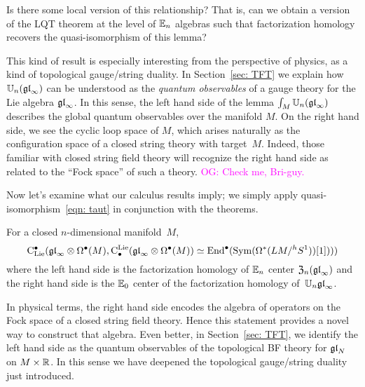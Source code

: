 \documentclass[11pt]{amsart}
\numberwithin{equation}{section}
\def\owen{\textcolor{magenta}{OG: }\textcolor{magenta}}
\begin{document}
\begin{qtn}
Is there some local version of this relationship? That is, can we obtain a version of the LQT theorem at the level of $\mathbb E_n$ algebras such that factorization homology recovers the quasi-isomorphism of this lemma?
\end{qtn}

This kind of result is especially interesting from the perspective of physics, 
as a kind of topological gauge/string duality.
In Section~\ref{sec: TFT} we explain how $\mathbb U_n({\mathfrak{gl}}_\infty)$ can be understood as the {\em quantum observables} of a gauge theory for the Lie algebra ${\mathfrak{gl}}_\infty$.
In this sense, the left hand side of the lemma $\int_M \mathbb U_n(\frak{gl}_\infty)$ describes the global quantum observables over the manifold $M$.
On the right hand side, we see the cyclic loop space of $M$,
which arises naturally as the configuration space of a closed string theory with target~$M$.
Indeed, those familiar with closed string field theory will recognize the right hand side as related to the ``Fock space'' of such a theory.
\owen{Check me, Bri-guy.}

Now let's examine what our calculus results imply;
we simply apply quasi-isomorphism~\eqref{eqn: taut} in conjunction with the theorems.

\begin{lmm}
For a closed $n$-dimensional manifold~$M$, 
\[
{\rm C}_{\rm Lie}^\bullet({\mathfrak{gl}}_\infty \otimes \Omega^\bullet(M), {\rm C}^{\rm Lie}_\bullet({\mathfrak{gl}}_\infty \otimes \Omega^\bullet(M)) \simeq {\rm End}^\bullet({\rm Sym}(\Omega^*(LM/^h S^1))[1])))
\]
where the left hand side is the factorization homology of $\mathbb E_n$ center ${\frak Z}_n({\mathfrak{gl}}_\infty)$ and the right hand side is the $\mathbb E_0$ center of the factorization homology of~$\mathbb U_n {\mathfrak{gl}}_\infty$.
\end{lmm}

In physical terms, the right hand side encodes the algebra of operators on the Fock space of a closed string field theory.
Hence this statement provides a novel way to construct that algebra.
Even better, in Section~\ref{sec: TFT}, we identify the left hand side as the quantum observables of the topological BF theory for ${\mathfrak{gl}}_N$ on $M \times \mathbb R$.
In this sense we have deepened the topological gauge/string duality just introduced.
\end{document}
